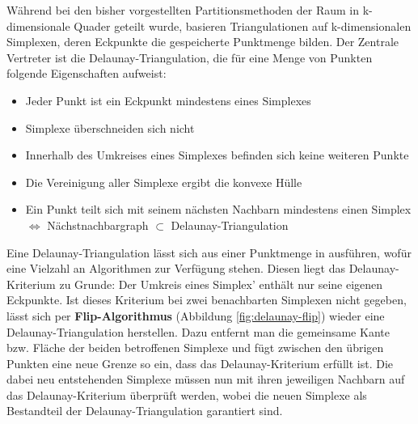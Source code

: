 Während bei den bisher vorgestellten Partitionsmethoden der Raum in k-dimensionale Quader geteilt wurde, basieren Triangulationen auf k-dimensionalen Simplexen, deren Eckpunkte die gespeicherte Punktmenge bilden.
Der Zentrale Vertreter ist die Delaunay-Triangulation, die für eine Menge von Punkten folgende Eigenschaften aufweist:

\begin{itemize}
\item Jeder Punkt ist ein Eckpunkt mindestens eines Simplexes
\item Simplexe überschneiden sich nicht
\item Innerhalb des Umkreises eines Simplexes befinden sich keine weiteren Punkte
\item Die Vereinigung aller Simplexe ergibt die konvexe Hülle
\item Ein Punkt teilt sich mit seinem nächsten Nachbarn mindestens einen Simplex \\
  $\Leftrightarrow$ Nächstnachbargraph $\subset$ Delaunay-Triangulation
\end{itemize}

Eine Delaunay-Triangulation lässt sich aus einer Punktmenge in  ausführen, wofür eine Vielzahl an Algorithmen zur Verfügung stehen. 
Diesen liegt das Delaunay-Kriterium zu Grunde:
Der Umkreis eines Simplex' enthält nur seine eigenen Eckpunkte.
Ist dieses Kriterium bei zwei benachbarten Simplexen nicht gegeben, lässt sich per \textbf{Flip-Algorithmus} (Abbildung \ref{fig:delaunay-flip}) wieder eine Delaunay-Triangulation herstellen.
Dazu entfernt man die gemeinsame Kante bzw. Fläche der beiden betroffenen Simplexe und fügt zwischen den übrigen Punkten eine neue Grenze so ein, dass das Delaunay-Kriterium erfüllt ist.
Die dabei neu entstehenden Simplexe müssen nun mit ihren jeweiligen Nachbarn auf das Delaunay-Kriterium überprüft werden, wobei die neuen Simplexe als Bestandteil der Delaunay-Triangulation garantiert sind.

